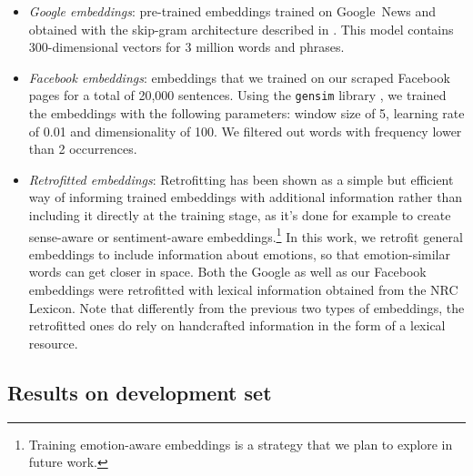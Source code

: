 \documentclass[11pt]{article}
\newcommand{\note}[1]{\textbf{*** #1 ***}}
\begin{document}
\begin{itemize} 

\item \textit{Google embeddings}: pre-trained embeddings trained on Google~News and obtained with the skip-gram architecture described in  \cite{mikolov2013distributed}. This model contains 300-dimensional vectors for 3 million words and phrases.

\item \textit{Facebook embeddings}: embeddings that we trained on our scraped Facebook pages for a total of 20,000 sentences. Using the \texttt{gensim} library \cite{gensim}, we trained the embeddings with the following parameters: window size of 5, learning rate of 0.01 and dimensionality of 100. We filtered out words with frequency lower than 2 occurrences.

\item \textit{Retrofitted embeddings}: 
Retrofitting \cite{retrofitting} has been shown as a simple but efficient way of informing trained embeddings with additional information rather than including it directly at the training stage, as it's done for example to create sense-aware \cite{iacobacci2015sensembed} or sentiment-aware \cite{tang:14} embeddings.\footnote{Training emotion-aware embeddings is a strategy that we plan to explore in future work.} In this work, we retrofit general embeddings to include information about emotions, so that emotion-similar words can get closer in space. Both the Google as well as our Facebook embeddings were retrofitted with lexical information obtained from the NRC Lexicon. Note that differently from the previous two types of embeddings, the retrofitted ones do rely on handcrafted information in the form of a lexical resource.




\end{itemize}

\subsection{Results on development set}
\end{document}
